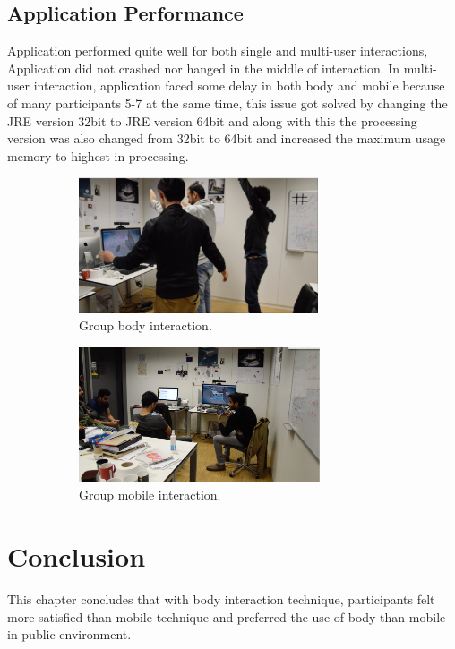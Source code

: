\subsection{Application Performance}
Application performed quite well for both single and multi-user interactions, Application did not crashed nor hanged in the middle of interaction. In multi-user interaction, application faced some delay in both body and mobile because of many participants 5-7 at the same time, this issue got solved by changing the 
JRE version 32bit to JRE version 64bit and along with this the processing version was also changed from 32bit to 64bit and increased the maximum usage memory to highest in processing.


\begin{figure}[H]
    \centering
    \begin{subfigure}[H]{0.45\textwidth}
        \centering
        \includegraphics[width=\textwidth,height=4cm]{Figures/6/groupBody}
        \caption{Group body interaction.}
        \label{fig:groupbody}
    \end{subfigure}
    \hfill
    \begin{subfigure}[H]{0.45\textwidth}
        \centering
        \includegraphics[width=\textwidth,height=4cm]{Figures/6/groupMobile}
        \caption{Group mobile interaction.}
        \label{fig:groupmobile}
    \end{subfigure}
    \caption{}
    \label{fig:Focus_group_room_interactive}
\end{figure}


\section{Conclusion}
This chapter concludes that with body interaction technique, participants felt more satisfied than mobile technique and preferred the use of body than mobile in public environment.


